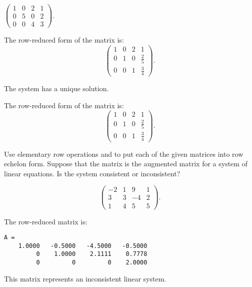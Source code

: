 \documentclass{ximera}
\begin{document}
\begin{exercise} \label{c2.3.11c}
$\left(\begin{array}{ccc|c}  1 & 0 & 2 & 1\\ 0 & 5 & 0 & 2 \\ 0 & 0 & 4 & 3
       \end{array}\right)$.
     \begin{multipleChoice}
     \end{multipleChoice}
     \begin{hint}
       The row-reduced form of the matrix is:
\[
\left(\begin{array}{rrr|r} 1 & 0 & 2 & 1 \\ 0 & 1 & 0 & \frac{2}{5}
\\ 0 & 0 & 1 & \frac{3}{4}\end{array}\right).
\]
     \end{hint}

\begin{solution}

\ans The system has a unique solution.

\soln The row-reduced form of the matrix is:
\[
\left(\begin{array}{rrr|r} 1 & 0 & 2 & 1 \\ 0 & 1 & 0 & \frac{2}{5}
\\ 0 & 0 & 1 & \frac{3}{4}\end{array}\right).
\]

\end{solution}
\end{exercise}

\matlabproblemlabel

\noindent Use elementary row operations and \Matlab to put each of the given matrices into row echelon form.  Suppose that the matrix is the augmented matrix for a system of linear equations.  Is the system consistent or inconsistent?

\begin{computerExercise} \label{c2.3.1c}
\[
\left(\begin{array}{rrrr}
 -2 & 1 &  9 & 1\\
  3 & 3 & -4 & 2\\
  1 & 4 &  5 & 5
\end{array}\right).
\]

\begin{solution}
The row-reduced matrix is:
\begin{verbatim}
A =
    1.0000   -0.5000   -4.5000   -0.5000
         0    1.0000    2.1111    0.7778
         0         0         0    2.0000
\end{verbatim}
This matrix represents an inconsistent linear system.


\end{solution}
\end{computerExercise}
\end{document}
